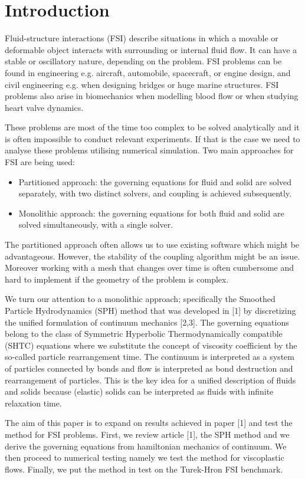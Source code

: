 \chapter*{Introduction}
Fluid-structure interactions (FSI) describe situations in which a movable or deformable object interacts with surrounding or internal fluid flow. 
It can have a stable or oscillatory nature, depending on the problem. FSI problems can be found in engineering e.g. aircraft, automobile, spacecraft, or engine design,
and civil engineering e.g. when designing bridges or huge marine structures. FSI problems also arise in biomechanics when modelling blood flow or when studying heart
valve dynamics.

These problems are most of the time too complex to be solved analytically and it is often impossible to conduct relevant experiments. 
If that is the case we need to analyse these problems utilising numerical simulation. Two main approaches for FSI are being used:
\begin{itemize}
    \item Partitioned approach: the governing equations for fluid and solid are solved separately, with two distinct solvers, and coupling is achieved subsequently.
    \item Monolithic approach: the governing equations for both fluid and solid are solved simultaneously, with a single solver.
\end{itemize} 
The partitioned approach often allows us to use existing software which might be advantageous. However, the stability of the coupling algorithm might be an issue. 
Moreover working with a mesh that changes over time is often cumbersome and hard to implement if the geometry of the problem is complex.

We turn our attention to a monolithic approach; specifically the Smoothed Particle Hydrodynamics (SPH) method that was developed in [1] by discretizing the unified formulation of continuum mechanics [2,3].
The governing equations belong to the class of Symmetric Hyperbolic Thermodynamically compatible (SHTC) equations where we substitute the concept of viscosity coefficient by the so-called
particle rearrangement time. The continuum is interpreted as a system of particles connected by bonds and flow is interpreted as bond destruction and rearrangement of particles. 
This is the key idea for a unified description of fluids and solids because (elastic) solids can be interpreted as fluids with infinite relaxation time.

The aim of this paper is to expand on results achieved in paper [1] and test the method for FSI problems. First, we review article [1], the SPH method and we derive the governing equations
from hamiltonian mechanics of continuum. We then proceed to numerical testing namely we test the method for viscoplastic flows. Finally, we put the method in test on the Turek-Hron FSI benchmark.

